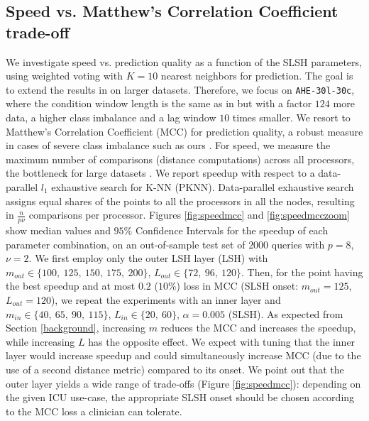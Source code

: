 \documentclass{article}
\begin{document}

\subsection{Speed vs. Matthew's Correlation Coefficient trade-off}
\label{tradeoff}

We investigate speed vs. prediction quality as a function of the SLSH parameters, using weighted voting with $K=10$ nearest neighbors for prediction. The goal is to extend the results in \cite{SLSHretrieval} on larger datasets. Therefore, we focus on \texttt{AHE-30l-30c}, where the condition window length is the same as in \cite{SLSHretrieval} but with a factor $124$ more data, a higher class imbalance and a lag window $10$ times smaller.
We resort to Matthew's Correlation Coefficient (MCC) for prediction quality, a robust measure in cases of severe class imbalance such as ours \cite{Powers2011EvaluationFP}. For speed, we measure the maximum number of comparisons (distance computations) across all processors, the bottleneck for large datasets \cite{LSHcomparison}. We report speedup with respect to a data-parallel $l_1$ exhaustive search for K-NN (PKNN). Data-parallel exhaustive search assigns equal shares of the points to all the processors in all the nodes, resulting in $\frac{n}{p\nu}$ comparisons per processor.
%
Figures \ref{fig:speedmcc} and \ref{fig:speedmcczoom} show median values and $95\%$ Confidence Intervals for the speedup of each parameter combination, on an out-of-sample test set of $2000$ queries with $p=8$, $\nu=2$. We first employ only the outer LSH layer (LSH) with $m_{out} \in \{100,\ 125,\ 150,\ 175,\ 200\}$, $L_{out} \in \{72,\ 96,\ 120\}$. Then, for the point having the best speedup and at most $0.2$ ($10\%$) loss in MCC (SLSH onset: $m_{out}=125$, $L_{out}=120$), we repeat the experiments with an inner layer and $m_{in} \in \{40,\ 65,\ 90,\ 115\}$, $L_{in} \in \{20,\ 60\}$, $\alpha=0.005$ (SLSH). As expected from Section \ref{background}, increasing $m$ reduces the MCC and increases the speedup, while increasing $L$ has the opposite effect. We expect with tuning that the inner layer would increase speedup and could simultaneously increase MCC (due to the use of a second distance metric) compared to its onset. We point out that the outer layer yields a wide range of trade-offs (Figure \ref{fig:speedmcc}): depending on the given ICU use-case, the appropriate SLSH onset should be chosen according to the MCC loss a clinician can tolerate.
\end{document}
